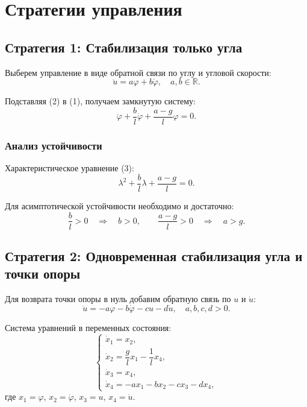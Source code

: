 \section{Стратегии управления}

\subsection{Стратегия 1: Стабилизация только угла}
Выберем управление в виде обратной связи по углу и угловой скорости:
\[
\ddot{u} = a\varphi + b\dot{\varphi}, \quad a,b \in \mathbb{R}. \tag{2}
\]

Подставляя (2) в (1), получаем замкнутую систему:
\[
\ddot{\varphi} + \frac{b}{l}\dot{\varphi} + \frac{a - g}{l}\varphi = 0. \tag{3}
\]

\subsubsection{Анализ устойчивости}
Характеристическое уравнение (3):
\[
\lambda^2 + \frac{b}{l}\lambda + \frac{a - g}{l} = 0.
\]

Для асимптотической устойчивости необходимо и достаточно:
\[
\frac{b}{l} > 0 \quad\Rightarrow\quad b > 0, \qquad \frac{a - g}{l} > 0 \quad\Rightarrow\quad a > g.
\]

\subsection{Стратегия 2: Одновременная стабилизация угла и точки опоры}
Для возврата точки опоры в нуль добавим обратную связь по \(u\) и \(\dot{u}\):
\[
\ddot{u} = -a\varphi - b\dot{\varphi} - cu - d\dot{u}, \quad a,b,c,d > 0. \tag{4}
\]

Система уравнений в переменных состояния:
\[
\begin{cases}
\dot{x}_1 = x_2, \\
\dot{x}_2 = \dfrac{g}{l}x_1 - \dfrac{1}{l}x_4, \\
\dot{x}_3 = x_4, \\
\dot{x}_4 = -a x_1 - b x_2 - c x_3 - d x_4,
\end{cases}
\]
где \(x_1 = \varphi\), \(x_2 = \dot{\varphi}\), \(x_3 = u\), \(x_4 = \dot{u}\).

